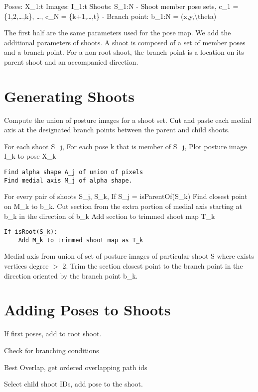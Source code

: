 Poses: X\_1:t
Images: I\_1:t
Shoots: S\_1:N
 - Shoot member pose sets, c\_1 = \{1,2,…,k\}, …, c\_N = \{k+1,…,t\}
 - Branch point: b\_1:N = (x,y,\textbackslash{}theta)

The first half are the same parameters used for the pose map. We add the additional parameters of shoots. A shoot is composed of a set of member poses and a branch point. For a non-root shoot, the branch point is a location on its parent shoot and an accompanied direction.

\section{Generating Shoots}
\label{generatingshoots}

Compute the union of posture images for a shoot set. Cut and paste each medial axis at the designated branch points between the parent and child shoots.

For each shoot S\_j,
 For each pose k that is member of S\_j,
 Plot posture image I\_k to pose X\_k

\begin{verbatim}
Find alpha shape A_j of union of pixels
Find medial axis M_j of alpha shape.
\end{verbatim}


For every pair of shoots S\_j, S\_k,
 If S\_j = isParentOf(S\_k)
 Find closest point on M\_k to b\_k.
 Cut section from the extra portion of medial axis starting at b\_k in the direction of b\_k
 Add section to trimmed shoot map T\_k

\begin{verbatim}
If isRoot(S_k):
    Add M_k to trimmed shoot map as T_k
\end{verbatim}


Medial axis from union of set of posture images of particular shoot S where exists vertices degree $>$ 2.
Trim the section closest point to the branch point in the direction oriented by the branch point b\_k.

\section{Adding Poses to Shoots}
\label{addingposestoshoots}

If first poses, add to root shoot.

Check for branching conditions

Best Overlap, get ordered overlapping path ids

Select child shoot IDs, add pose to the shoot.

